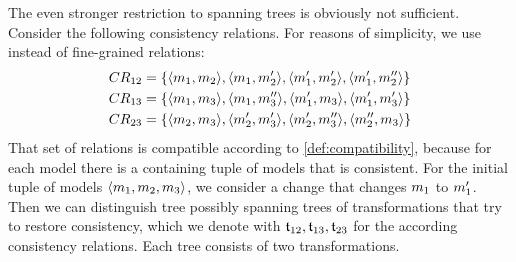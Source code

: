 The even stronger restriction to spanning trees is obviously not sufficient.
Consider the following consistency relations. For reasons of simplicity, we use \modellevelconsistencyrelations instead of fine-grained relations:
\begin{align*}
    & 
    CR_{12} = \{ \langle m_{1}, m_{2} \rangle, \langle m_{1}, m_{2}' \rangle, \langle m_{1}', m_{2}' \rangle, \langle m_{1}', m_{2}'' \rangle \} \\
    & 
    CR_{13} = \{ \langle m_{1}, m_{3} \rangle, \langle m_{1}, m_{3}'' \rangle, \langle m_{1}', m_{3} \rangle, \langle m_{1}', m_{3}' \rangle \} \\
    & 
    CR_{23} = \{ \langle m_{2}, m_{3} \rangle, \langle m_{2}', m_{3}' \rangle, \langle m_{2}', m_{3}'' \rangle, \langle m_{2}'', m_{3} \rangle \} 
\end{align*}
That set of relations is compatible according to \autoref{def:compatibility}, because for each model there is a containing tuple of models that is consistent.
For the initial tuple of models $\langle m_{1}, m_{2}, m_{3} \rangle$, we consider a change that changes $m_{1}$ to $m_{1}'$.
Then we can distinguish tree possibly spanning trees of transformations that try to restore consistency, which we denote with $\mathfrak{t}_{12}, \mathfrak{t}_{13}, \mathfrak{t}_{23}$ for the according consistency relations.
Each tree consists of two transformations.
